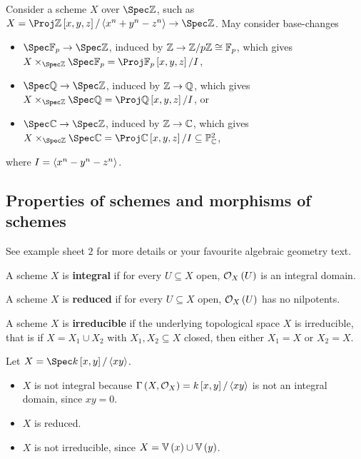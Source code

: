 \begin{example*}
Consider a scheme $ X $ over $ \Spec \ZZ $, such as $ X = \Proj \ZZ\sbr{x, y, z} / \abr{x^n + y^n - z^n} \to \Spec \ZZ $. May consider base-changes
\begin{itemize}
\item $ \Spec \FF_p \to \Spec \ZZ $, induced by $ \mathbb{Z} \to \mathbb{Z} / p\mathbb{Z} \cong \mathbb{F}_p $, which gives $ X \times_{\Spec \ZZ} \Spec \FF_p = \Proj \FF_p\sbr{x, y, z} / I $,
\item $ \Spec \QQ \to \Spec \ZZ $, induced by $ \mathbb{Z} \to \mathbb{Q} $, which gives $ X \times_{\Spec \ZZ} \Spec \QQ = \Proj \QQ\sbr{x, y, z} / I $, or
\item $ \Spec \CC \to \Spec \ZZ $, induced by $ \mathbb{Z} \to \mathbb{C} $, which gives $ X \times_{\Spec \ZZ} \Spec \CC = \Proj \CC\sbr{x, y, z} / I \subseteq \PP_\CC^2 $,
\end{itemize}
where $ I = \left\langle x^n - y^n - z^n \right\rangle $.
\end{example*}

\subsection{Properties of schemes and morphisms of schemes}

See example sheet $ 2 $ for more details or your favourite algebraic geometry text.

\begin{definition*}
A scheme $ X $ is \textbf{integral} if for every $ U \subseteq X $ open, $ \OOO_X\br{U} $ is an integral domain.
\end{definition*}

\begin{definition*}
A scheme $ X $ is \textbf{reduced} if for every $ U \subseteq X $ open, $ \OOO_X\br{U} $ has no nilpotents.
\end{definition*}

\begin{definition*}
A scheme $ X $ is \textbf{irreducible} if the underlying topological space $ X $ is irreducible, that is if $ X = X_1 \cup X_2 $ with $ X_1, X_2 \subseteq X $ closed, then either $ X_1 = X $ or $ X_2 = X $.
\end{definition*}

\begin{example*}
Let $ X = \Spec k\sbr{x, y} / \abr{xy} $.
\begin{itemize}
\item $ X $ is not integral because $ \Gamma\br{X, \OOO_X} = k\sbr{x, y} / \abr{xy} $ is not an integral domain, since $ xy = 0 $.
\item $ X $ is reduced.
\item $ X $ is not irreducible, since $ X = \VV\br{x} \cup \VV\br{y} $.
\end{itemize}
\end{example*}

